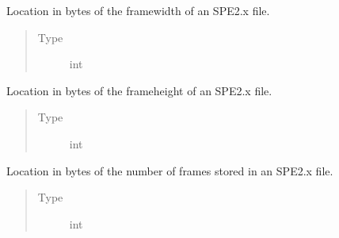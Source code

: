 \documentclass[a4paper,10pt,english]{sphinxmanual}
\begin{document}
\begin{fulllineitems}
\begin{fulllineitems}
\begin{quote}
\begin{description}
\end{description}\end{quote}

\end{fulllineitems}


\begin{fulllineitems}
\label{\detokenize{sfgtools:sfgtools.SFGProcessTools.framewidth_loc}}
\sphinxAtStartPar
Location in bytes of the framewidth of an SPE2.x file.
\begin{quote}\begin{description}
\item[{Type}] \leavevmode
\sphinxAtStartPar
int

\end{description}\end{quote}

\end{fulllineitems}


\begin{fulllineitems}
\label{\detokenize{sfgtools:sfgtools.SFGProcessTools.frameheight_loc}}
\sphinxAtStartPar
Location in bytes of the frameheight of an SPE2.x file.
\begin{quote}\begin{description}
\item[{Type}] \leavevmode
\sphinxAtStartPar
int

\end{description}\end{quote}

\end{fulllineitems}


\begin{fulllineitems}
\label{\detokenize{sfgtools:sfgtools.SFGProcessTools.numframes_loc}}
\sphinxAtStartPar
Location in bytes of the number of frames stored in an SPE2.x file.
\begin{quote}\begin{description}
\item[{Type}] \leavevmode
\sphinxAtStartPar
int


\end{description}
\end{quote}
\end{fulllineitems}
\end{fulllineitems}
\end{document}
